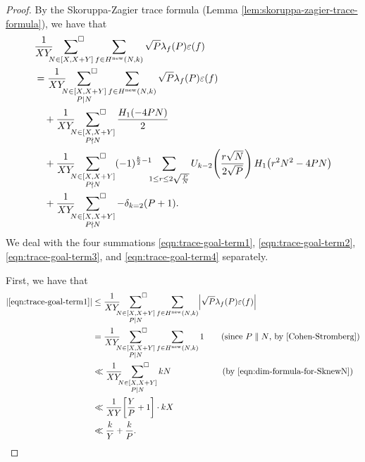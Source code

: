 \documentclass[12pt,letterpaper,reqno]{amsart}
\theoremstyle{plain}
\theoremstyle{definition}
\numberwithin{equation}{section}
\numberwithin{figure}{section}
\numberwithin{table}{section}
\newcommand{\lrabs}[1]{\!\left\lvert #1 \right\lvert}
\newcommand{\lrp}[1]{\!\left(#1\right)}
\newcommand{\lrb}[1]{\!\left[#1\right]}
\newcommand{\new}{{\rm new}}
\begin{document}
\begin{proof}
By the Skoruppa-Zagier trace formula (Lemma \ref{lem:skoruppa-zagier-trace-formula}), we have that
\begin{align}
    &\frac{1}{XY} \sideset{}{^\square} \sum_{\substack{N \in [X, X+Y]}} \sum_{f \in H^\new(N,k)} \sqrt{P}\lambda_f(P)\varepsilon(f) \\
    &=
    \frac{1}{XY} \sideset{}{^\square} \sum_{\substack{N \in [X, X+Y] \\ P \mid N}} \sum_{f \in H^\new(N,k)} \sqrt{P}\lambda_f(P)\varepsilon(f) 
    \label{eqn:trace-goal-term1}
    \\
    &\quad +\frac{1}{XY} \sideset{}{^\square}\sum_{\substack{N \in [X, X+Y] \\ P \nmid N}}  \frac{H_1(-4PN)}{2} 
    \label{eqn:trace-goal-term2}
    \\
    &\quad + \frac{1}{XY} \sideset{}{^\square}\sum_{\substack{N \in [X, X+Y] \\ P \nmid N}}
    (-1)^{\frac{k}{2}-1}\!\!\! 
    \sum_{1 \le r \le 2\sqrt{\frac{P}{N}}}U_{k-2}\lrp{\frac{r\sqrt{N}}{2\sqrt{P}}}H_1\lrp{r^2N^2-4PN} 
    \label{eqn:trace-goal-term3}
    \\
    &\quad + \frac{1}{XY} \sideset{}{^\square}\sum_{\substack{N \in [X, X+Y] \\ P \nmid N}} -\delta_{k=2}(P+1). 
    \label{eqn:trace-goal-term4}
\end{align}
We deal with the four summations \eqref{eqn:trace-goal-term1}, \eqref{eqn:trace-goal-term2}, \eqref{eqn:trace-goal-term3}, and \eqref{eqn:trace-goal-term4} separately. 

First, we have that
\begin{align}
    |\eqref{eqn:trace-goal-term1}| 
    &\le 
    \frac{1}{XY} \sideset{}{^\square} \sum_{\substack{N \in [X, X+Y] \\ P \mid N}} \sum_{f \in H^\new(N,k)} \lrabs{\sqrt{P}\lambda_f(P)\varepsilon(f)} \\
    &= \frac{1}{XY} \sideset{}{^\square} \sum_{\substack{N \in [X, X+Y] \\ P \mid N}} \sum_{f \in H^\new(N,k)} 1 \qquad \text{(since $P \parallel N$, by \cite[Proposition 13.3.14]{Cohen-Stromberg})} \\
    &\ll \frac{1}{XY} \sideset{}{^\square} \sum_{\substack{N \in [X, X+Y] \\ P \mid N}} kN 
    \qquad\qquad\qquad \text{(by \eqref{eqn:dim-formula-for-SknewN})}
    \\
    &\ll \frac{1}{XY} \lrb{\frac{Y}{P} + 1} \cdot k X \\
    &\ll \frac{k}{Y} + \frac{k}{P}.
\end{align}


\end{proof}
\end{document}
